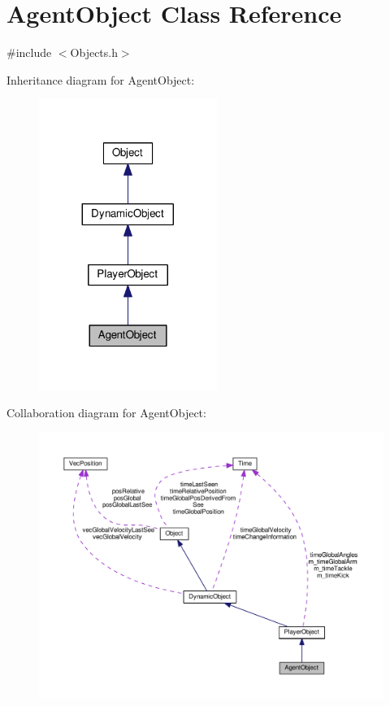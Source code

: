\hypertarget{classAgentObject}{}\section{Agent\+Object Class Reference}
\label{classAgentObject}


{\ttfamily \#include $<$Objects.\+h$>$}



Inheritance diagram for Agent\+Object\+:
\nopagebreak
\begin{figure}[H]
\begin{center}
\leavevmode
\includegraphics[width=164pt]{classAgentObject__inherit__graph}
\end{center}
\end{figure}


Collaboration diagram for Agent\+Object\+:
\nopagebreak
\begin{figure}[H]
\begin{center}
\leavevmode
\includegraphics[width=350pt]{classAgentObject__coll__graph}
\end{center}
\end{figure}
